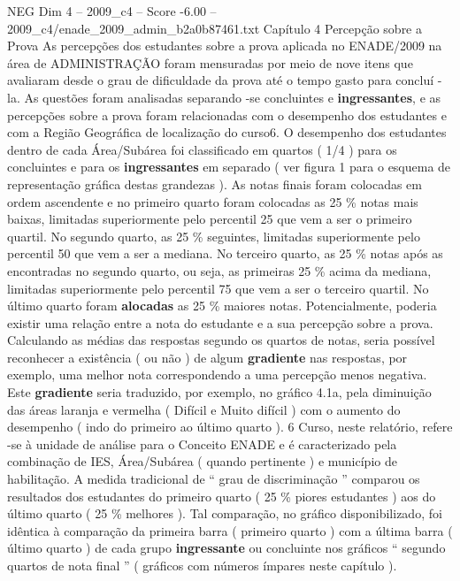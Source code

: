 \begin{textsample}{NEG Dim 4 – 2009\_c4 – Score -6.00 – 2009\_c4/enade\_2009\_admin\_b2a0b87461.txt}  \label{ex:f4_neg_025}
Capítulo 4 Percepção sobre a Prova As percepções dos estudantes sobre a prova aplicada no ENADE/2009 na área de ADMINISTRAÇÃO foram mensuradas por meio de nove itens que avaliaram desde o grau de dificuldade da prova até o tempo gasto para concluí -la.
As questões foram analisadas separando -se concluintes e \textbf{ingressantes}, e as percepções sobre a prova foram relacionadas com o desempenho dos estudantes e com a Região Geográfica de localização do curso6.
O desempenho dos estudantes dentro de cada Área/Subárea foi classificado em quartos ( 1/4 ) para os concluintes e para os \textbf{ingressantes} em separado ( ver figura 1 para o esquema de representação gráfica destas grandezas ).
As notas finais foram colocadas em ordem ascendente e no primeiro quarto foram colocadas as 25 \% notas mais baixas, limitadas superiormente pelo percentil 25 que vem a ser o primeiro quartil.
No segundo quarto, as 25 \% seguintes, limitadas superiormente pelo percentil 50 que vem a ser a mediana.
No terceiro quarto, as 25 \% notas após as encontradas no segundo quarto, ou seja, as primeiras 25 \% acima da mediana, limitadas superiormente pelo percentil 75 que vem a ser o terceiro quartil.
No último quarto foram \textbf{alocadas} as 25 \% maiores notas.
Potencialmente, poderia existir uma relação entre a nota do estudante e a sua percepção sobre a prova.
Calculando as médias das respostas segundo os quartos de notas, seria possível reconhecer a existência ( ou não ) de algum \textbf{gradiente} nas respostas, por exemplo, uma melhor nota correspondendo a uma percepção menos negativa.
Este \textbf{gradiente} seria traduzido, por exemplo, no gráfico 4.1a, pela diminuição das áreas laranja e vermelha ( Difícil e Muito difícil ) com o aumento do desempenho ( indo do primeiro ao último quarto ). 6 Curso, neste relatório, refere -se à unidade de análise para o Conceito ENADE e é caracterizado pela combinação de IES, Área/Subárea ( quando pertinente ) e município de habilitação.
A medida tradicional de “ grau de discriminação ” comparou os resultados dos estudantes do primeiro quarto ( 25 \% piores estudantes ) aos do último quarto ( 25 \% melhores ).
Tal comparação, no gráfico disponibilizado, foi idêntica à comparação da primeira barra ( primeiro quarto ) com a última barra ( último quarto ) de cada grupo \textbf{ingressante} ou concluinte nos gráficos “ segundo quartos de nota final ” ( gráficos com números ímpares neste capítulo ).

\end{textsample}
